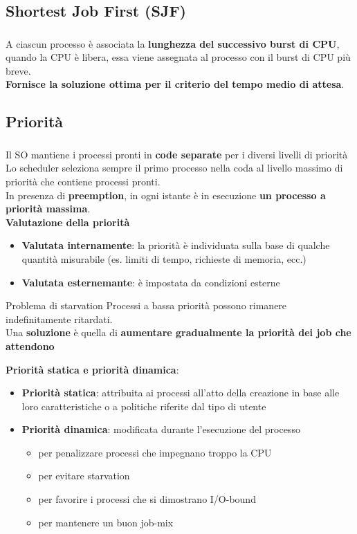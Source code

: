 \documentclass{beamer}
\newenvironment{mainframe}{
	\begin{frame}
		\frametitle{\insertsubsection}
		\framesubtitle{\insertsection}
	}{
	\end{frame}
}
\begin{document}
\subsection{Shortest Job First (SJF)}
\begin{mainframe}
	A ciascun processo è associata la \textbf{lunghezza del successivo burst di CPU}, quando la CPU è libera, essa viene assegnata al processo con il burst di CPU più breve.\\
	\textbf{Fornisce la soluzione ottima per il criterio del tempo medio di attesa}.
\end{mainframe}
\subsection{Priorità}
\begin{mainframe}
	Il SO mantiene i processi pronti in \textbf{code separate} per i diversi livelli di priorità\\
	Lo scheduler seleziona sempre il primo processo nella coda al livello massimo di priorità che contiene processi pronti.\\
	In presenza di \textbf{preemption}, in ogni istante è in esecuzione \textbf{un processo a priorità massima}.\\
	\textbf{Valutazione della priorità}
	\begin{itemize}
		\item \textbf{Valutata internamente}: la priorità è individuata sulla base di qualche quantità misurabile (es. limiti di tempo, richieste di memoria, ecc.)
		\item \textbf{Valutata esternemante}: è impostata da condizioni esterne
	\end{itemize}
\end{mainframe}
\begin{frame}
	\begin{block}{Problema di starvation}	
		Processi a bassa priorità possono rimanere indefinitamente ritardati.\\
		Una \textbf{soluzione} è quella di \textbf{aumentare gradualmente la priorità dei job che attendono}
	\end{block}
	\textbf{Priorità statica e priorità dinamica}:
	\begin{itemize}
		\item \textbf{Priorità statica}: attribuita ai processi all'atto della creazione in base alle loro caratteristiche o a politiche riferite dal tipo di utente
		\item \textbf{Priorità dinamica}: modificata durante l'esecuzione del processo
		\begin{itemize}
			\item per penalizzare processi che impegnano troppo la CPU
			\item per evitare starvation
			\item per favorire i processi che si dimostrano I/O-bound
			\item per mantenere un buon job-mix
		\end{itemize}
	\end{itemize}
\end{frame}
\end{document}
